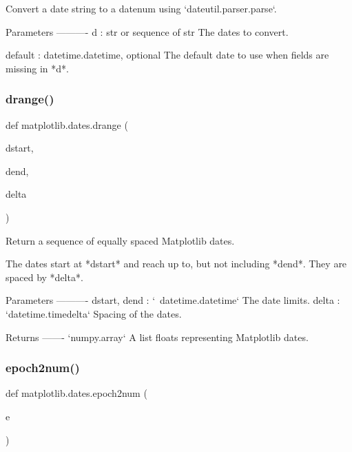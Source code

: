 \begin{DoxyVerb}Convert a date string to a datenum using `dateutil.parser.parse`.

Parameters
----------
d : str or sequence of str
    The dates to convert.

default : datetime.datetime, optional
    The default date to use when fields are missing in *d*.
\end{DoxyVerb}
 \mbox{\label{namespacematplotlib_1_1dates_adb2949a7d987acfc70682fe50ddc796f}} 
\subsubsection{\texorpdfstring{drange()}{drange()}}
{\footnotesize\ttfamily def matplotlib.\+dates.\+drange (\begin{DoxyParamCaption}\item[{}]{dstart,  }\item[{}]{dend,  }\item[{}]{delta }\end{DoxyParamCaption})}

\begin{DoxyVerb}Return a sequence of equally spaced Matplotlib dates.

The dates start at *dstart* and reach up to, but not including *dend*.
They are spaced by *delta*.

Parameters
----------
dstart, dend : `~datetime.datetime`
    The date limits.
delta : `datetime.timedelta`
    Spacing of the dates.

Returns
-------
`numpy.array`
    A list floats representing Matplotlib dates.\end{DoxyVerb}
 \mbox{\label{namespacematplotlib_1_1dates_ae10f26f7ee1271c0f285ba1e49cbe8c8}} 
\subsubsection{\texorpdfstring{epoch2num()}{epoch2num()}}
{\footnotesize\ttfamily def matplotlib.\+dates.\+epoch2num (\begin{DoxyParamCaption}\item[{}]{e }\end{DoxyParamCaption})}

